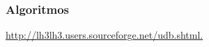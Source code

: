 \subsubsection{Algoritmos}
\label{subsec:subsubsection:algoritmos:desenho}

\begin{figure}[<+htpb+>]
	\centering
	\caption{}
	\label{fig:}
\end{figure}


\begin{figure}[<+htpb+>]
	\centering
	\caption{}
	\label{fig:}
\end{figure}

\begin{figure}[<+htpb+>]
	\centering
	\caption{}
	\label{fig:}
\end{figure}

\begin{figure}[<+htpb+>]
	\centering
	\caption{}
	\label{fig:}
\end{figure}



\url{http://lh3lh3.users.sourceforge.net/udb.shtml.}

